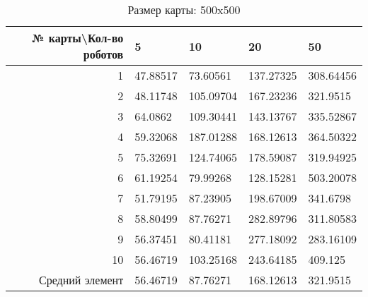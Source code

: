 \begin{table}[H]
\centering
\begin{tabular}{|r|l|l|l|l|}
\hline
№ карты\textbackslash Кол-во роботов & \textbf{5} & \textbf{10} & \textbf{20} & \textbf{50}\\ \hline
1 & 47.88517 & 73.60561 & 137.27325 & 308.64456\\ \hline
2 & 48.11748 & 105.09704 & 167.23236 & 321.9515\\ \hline
3 & 64.0862 & 109.30441 & 143.13767 & 335.52867\\ \hline
4 & 59.32068 & 187.01288 & 168.12613 & 364.50322\\ \hline
5 & 75.32691 & 124.74065 & 178.59087 & 319.94925\\ \hline
6 & 61.19254 & 79.99268 & 128.15281 & 503.20078\\ \hline
7 & 51.79195 & 87.23905 & 198.67009 & 341.6798\\ \hline
8 & 58.80499 & 87.76271 & 282.89796 & 311.80583\\ \hline
9 & 56.37451 & 80.41181 & 277.18092 & 283.16109\\ \hline
10 & 56.46719 & 103.25168 & 243.64185 & 409.125\\ \hline
Средний элемент & 56.46719 & 87.76271 & 168.12613 & 321.9515\\ \hline
\end{tabular}
\caption*{Размер карты: 500x500}
\end{table}
